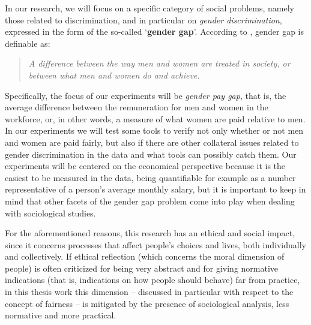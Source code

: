 In our research, we will focus on a specific category of social problems, namely those related to discrimination, and in particular on \textit{gender discrimination}, expressed in the form of the so-called `\textbf{gender gap}'. According to \cite{cambridge2013gender}, gender gap is definable as:
\begin{quote}\emph{A difference between the way men and women are treated in society, or between what men and women do and achieve.} \cite{cambridge2013gender}\end{quote}

Specifically, the focus of our experiments will be \textit{gender pay gap}, that is, the average difference between the remuneration for men and women in the workforce, or, in other words, a measure of what women are paid relative to men. In our experiments we will test some tools to verify not only whether or not men and women are paid fairly, but also if there are other collateral issues related to gender discrimination in the data and what tools can possibly catch them.
Our experiments will be centered on the economical perspective because it is the easiest to be measured in the data, being quantifiable for example as a number representative of a person's average monthly salary, but it is important to keep in mind that other facets of the gender gap problem come into play when dealing with sociological studies.

For the aforementioned reasons, this research has an ethical and social impact, since it concerns processes that affect people's choices and lives, both individually and collectively. If ethical reflection (which concerns the moral dimension of people) is often criticized for being very abstract and for giving normative indications (that is, indications on how people should behave) far from practice, in this thesis work this dimension -- discussed in particular with respect to the concept of fairness -- is mitigated by the presence of sociological analysis, less normative and more practical.


